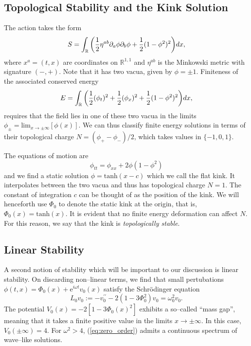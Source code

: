 \subsection{Topological Stability and the Kink Solution}
The action takes the form
\[
S=\int_{\mathbb{R}}\bigg( \frac{1}{2}\eta^{ab}\partial_a\phi\partial_b\phi + \frac{1}{2}(1-\phi^2)^2\bigg)dx,
\]
where $x^a=(t,x)$ are coordinates on $\mathbb{R}^{1,1}$ and $\eta^{ab}$ is the Minkowski metric with signature $(-,+)$. Note that it has two vacua, given by $\phi=\pm 1$. Finiteness of the associated conserved energy
\[
E = \int_{\mathbb{R}} \bigg( \frac{1}{2}(\phi_t)^2 + \frac{1}{2}(\phi_x)^2 + \frac{1}{2}(1-\phi^2)^2 \bigg)dx,
\]
requires that the field lies in one of these two vacua in the limits $\phi_\pm=\mathrm{lim}_{x\rightarrow \pm \infty}[\phi(x)]$. We can thus classify finite energy solutions in terms of their topological charge $N = (\phi_+-\phi_-)/2$, which takes values in $\{-1,0,1\}$.




The equations of motion are
\begin{equation}
\label{eom:R11}
\phi_{tt}=\phi_{xx} + 2\phi(1-\phi^2)
\end{equation}
and we find a static solution $\phi=\mathrm{tanh}(x-c)$ which we call the flat kink. It interpolates between the two vacua and thus has topological charge $N=1$. The constant of integration $c$ can be thought of as the position of the kink. We will henceforth use $\Phi_0$ to denote the static kink at the origin, that is, $\Phi_0(x)=\mathrm{tanh}(x)$. It is evident that no finite energy deformation can affect $N$. For this reason, we say that the kink is \textit{topologically stable}. 

\subsection{Linear Stability}

A second notion of stability which will be important to our discussion is linear stability. On discarding non--linear terms, we find that small pertubations $\phi(t,x)=\Phi_0(x)+\mathrm{e}^{i\omega t}v_0(x)$ satisfy the Schr\"odinger equation
\begin{equation}
\label{eq:zero_order}
L_0v_0:=-v_0^{\prime\prime} - 2(1-3\Phi_0^2)v_0 = \omega^2_0v_0.
\end{equation}
The potential $V_0(x)=-2[1-3\Phi_0(x)^2]$ exhibits a so--called ``mass gap'', meaning that it takes a finite positive value in the limits $x\rightarrow\pm\infty$. In this case, $V_0(\pm\infty)=4$. For $\omega^2>4$, (\ref{eq:zero_order}) admits a continuous spectrum of wave--like solutions.

